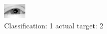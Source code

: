 \begin{figure}[h!]
\begin{center}
\includegraphics[width=0.60\columnwidth]{figures/ID2259_class_1_target_2.png}
\end{center}
\caption{ Classification: 1 actual target: 2}
\label{fig:ID2259_class_1_target_2}
\end{figure}
